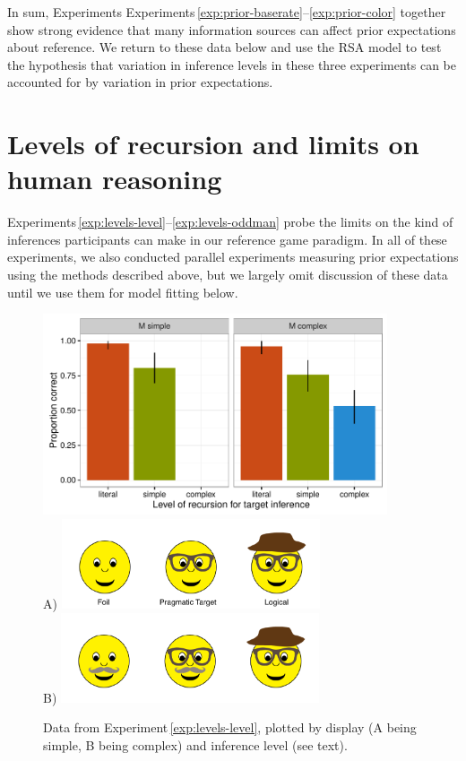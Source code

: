 \documentclass[man,noapacite]{apa2}
\newcounter{Experiment}
\newcommand{\exptref}[1]{Experiment\,\ref{#1}}
\newcommand{\exptrefrange}[2]{Experiments\,\ref{#1}--\ref{#2}}
\begin{document}
In sum, Experiments \exptrefrange{exp:prior-baserate}{exp:prior-color} together show strong evidence that many information sources can affect prior expectations about reference. We return to these data below and use the RSA model to test the hypothesis that variation in inference levels in these three experiments can be accounted for by variation in prior expectations.


\section{Levels of recursion and limits on human reasoning}
\label{sec:levels}

\exptrefrange{exp:levels-level}{exp:levels-oddman} probe the limits on the kind of inferences participants can make in our reference game paradigm. In all of these experiments, we also conducted parallel experiments measuring prior expectations using the methods described above, but we largely omit discussion of these data until we use them for model fitting below.


 \begin{figure}[t]
  \centering
  \includegraphics[width=4in]{../plots/3-levels-levels.pdf}\\
  A) \includegraphics[width=3in]{figures/hatglasses.pdf}\\
  B) \includegraphics[width=3in]{figures/levels-levels-stim.pdf}
  \caption{\label{fig:levels-level} Data from \exptref{exp:levels-level}, plotted by display (A being simple, B being complex) and inference level (see text).}
\end{figure}
\end{document}
